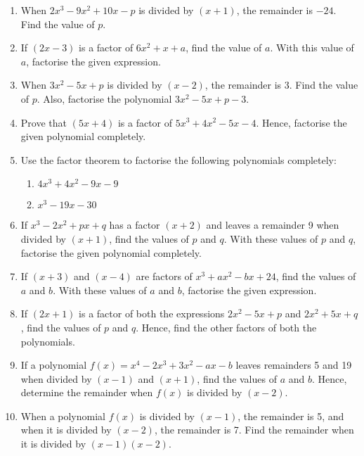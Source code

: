 \documentclass[12pt]{article}
\begin{document}
\begin{multicols}{2}
\begin{enumerate}
\begin{enumerate}
	\item When \( 2x^3 - 9x^2 + 10x - p \) is divided by \( (x + 1) \), the remainder is \(-24\). Find the value of \( p \).
	
	\item If \( (2x - 3) \) is a factor of \( 6x^2 + x + a \), find the value of \( a \). With this value of \( a \), factorise the given expression.
	
	\item When \( 3x^2 - 5x + p \) is divided by \( (x - 2) \), the remainder is 3. Find the value of \( p \). Also, factorise the polynomial \( 3x^2 - 5x + p - 3 \).
	
	\item Prove that \( (5x + 4) \) is a factor of \( 5x^3 + 4x^2 - 5x - 4 \). Hence, factorise the given polynomial completely.
	
	\item Use the factor theorem to factorise the following polynomials completely:
	\begin{enumerate}
	\item \( 4x^3 + 4x^2 - 9x - 9 \)
	\item \( x^3 - 19x - 30 \)
	\end{enumerate}
	
	\item If \( x^3 - 2x^2 + px + q \) has a factor \( (x + 2) \) and leaves a remainder 9 when divided by \( (x + 1) \), find the values of \( p \) and \( q \). With these values of \( p \) and \( q \), factorise the given polynomial completely.
	
	\item If \( (x + 3) \) and \( (x - 4) \) are factors of \( x^3 + ax^2 - bx + 24 \), find the values of \( a \) and \( b \). With these values of \( a \) and \( b \), factorise the given expression.
	
	\item If \( (2x + 1) \) is a factor of both the expressions \( 2x^2 - 5x + p \) and \( 2x^2 + 5x + q \), find the values of \( p \) and \( q \). Hence, find the other factors of both the polynomials.
	
	\item If a polynomial \( f(x) = x^4 - 2x^3 + 3x^2 - ax - b \) leaves remainders 5 and 19 when divided by \( (x - 1) \) and \( (x + 1) \), find the values of \( a \) and \( b \). Hence, determine the remainder when \( f(x) \) is divided by \( (x - 2) \).
	
	\item When a polynomial \( f(x) \) is divided by \( (x - 1) \), the remainder is 5, and when it is divided by \( (x - 2) \), the remainder is 7. Find the remainder when it is divided by \( (x - 1)(x - 2) \).
	\end{enumerate}

	\center{******************}	
	\end{enumerate}
	\end{multicols}
	
\end{document}
